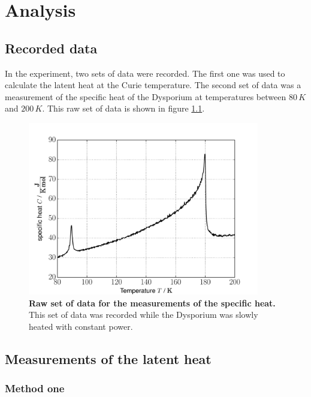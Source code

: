 \documentclass{include/thesisclass3}
\newcommand{\e}[1]{\,\si{#1}}
\begin{document}
\chapter{Analysis}


\section{Recorded data}
In the experiment, two sets of data were recorded.
The first one was used to calculate the latent heat at the Curie temperature.
The second set of data was a measurement of the specific heat of the Dysporium at temperatures between $80\e{K}$ and $200\e{K}$. This raw set of data is shown in figure \ref{data}.
\begin{figure}[H]
\includegraphics[width = 0.9\textwidth]{fig/data.pdf}
\caption{\label{data}\textbf{Raw set of data for the measurements of the specific heat.} This set of data was recorded while the Dysporium was slowly heated with constant power.}
\end{figure}


\section{Measurements of the latent heat}
\subsection{Method one}
\end{document}
